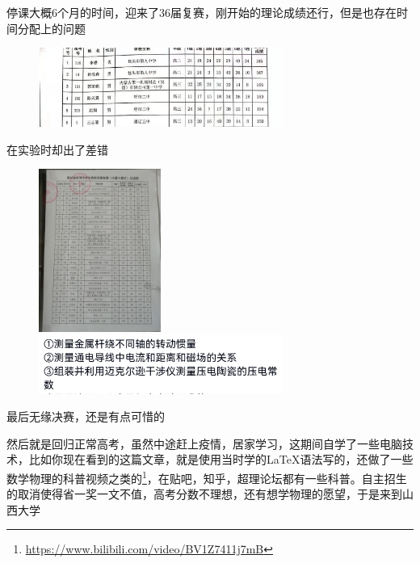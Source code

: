 \documentclass[hyperref,UTF8]{ctexart}
\begin{document}
停课大概6个月的时间，迎来了36届复赛，刚开始的理论成绩还行，但是也存在时间分配上的问题
\begin{figure}[H]
    \centering
    \includegraphics[width=8cm]{qq_pic_merged_1569110757334.jpg}
\end{figure}
在实验时却出了差错
\begin{figure}[H]
    \centering
    \includegraphics[width=4cm]{IMG20190923090754.jpg}
    \includegraphics[width=8cm]{Screenshot_20210907_141255.jpg}
\end{figure}
最后无缘决赛，还是有点可惜的

然后就是回归正常高考，虽然中途赶上疫情，居家学习，这期间自学了一些电脑技术，比如你现在看到的这篇文章，就是使用当时学的\LaTeX 语法写的，还做了一些数学物理的科普视频之类的\footnote{\url{https://www.bilibili.com/video/BV1Z7411j7mB}}，在贴吧，知乎，超理论坛都有一些科普。自主招生的取消使得省一奖一文不值，高考分数不理想，还有想学物理的愿望，于是来到山西大学
\end{document}
